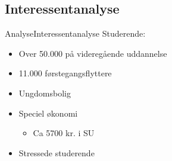 \subsection{Interessentanalyse}
\begin{frame}{Analyse}{Interessentanalyse}
Studerende:
\begin{itemize}
\item Over 50.000 på videregående uddannelse
\item 11.000 førstegangsflyttere
\item Ungdomsbolig
\item Speciel økonomi
\begin{itemize}
\item Ca 5700 kr. i SU
\end{itemize}
\item Stressede studerende
\end{itemize}
\end{frame}
